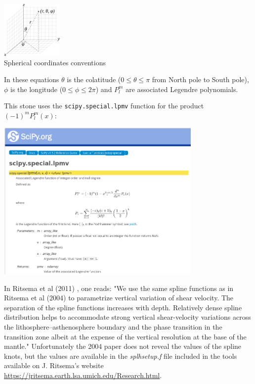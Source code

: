 \begin{center}
\includegraphics[width=3cm]{images/sphcoord}\\
{\captionfont Spherical coordinates conventions}
\end{center}

In these equations $\theta$ is the colatitude ($0\le\theta\le \pi$ from North pole to South pole), $\phi$
is the longitude ($0\le\phi\le 2\pi$) and $P_l^m$ are associated Legendre polynomials. 

This stone uses the {\tt scipy.special.lpmv} function for the product $(-1)^m P_l^m(x)$:
\begin{center}
\includegraphics[width=10cm]{python_codes/fieldstone_85/images/lpmv}
\end{center}

In Ritsema et al (2011) \cite{ridv11}, one reads: "We use the same 
spline functions as in Ritsema et al (2004) \cite{rivw04} to parametrize vertical 
variation of shear velocity. The separation of the spline functions
increases with depth. Relatively dense spline distribution helps to
accommodate strong vertical shear-velocity variations across the
lithosphere–asthenosphere boundary and the phase transition in the
transition zone albeit at the expense of the vertical resolution at
the base of the mantle."
Unfortunately the 2004 paper does not reveal the values of the spline knots, but the values
are available in the {\sl splhsetup.f} file included in the tools available 
on J. Ritsema's website \url{https://jritsema.earth.lsa.umich.edu/Research.html}.

